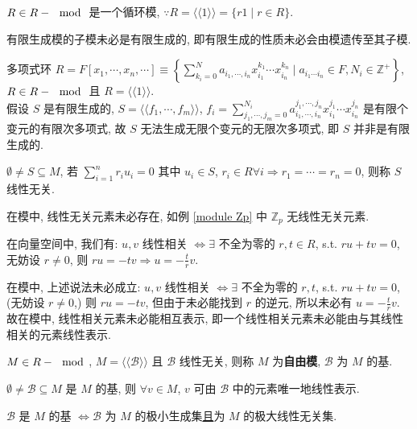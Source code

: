 \documentclass{note}
\begin{document}
\begin{eg}
    $R\in R-\mod$ 是一个循环模, $\because R=\langle\langle 1\rangle\rangle=\{r1\mid r\in R\}$.
\end{eg}

有限生成模的子模未必是有限生成的, 即有限生成的性质未必会由模遗传至其子模.
\begin{eg}
    多项式环 $R=F[x_1,\cdots,x_n,\cdots]\equiv\left\{\sum_{k_i=0}^Na_{i_1,\cdots,i_n}x_{i_1}^{k_1}\cdots x_{i_n}^{k_n}\mid a_{i_1\cdots i_n}\in F,N_i\in\mathbb{Z}^+\right\}$, $R\in R-\mod$ 且 $R=\langle\langle 1\rangle\rangle$.\\
    假设 $S$ 是有限生成的, $S=\langle\langle f_1,\cdots,f_m\rangle\rangle$, $f_i=\sum_{j_1,\cdots,j_m=0}^{N_i}a_{i_1,\cdots,i_n}^{j_1,\cdots,j_n}x_{i_1}^{j_1}\cdots x_{i_n}^{j_n}$ 是有限个变元的有限次多项式, 故 $S$ 无法生成无限个变元的无限次多项式, 即 $S$ 并非是有限生成的.
\end{eg}

\begin{df}[线性无关]
    $\emptyset\neq S\subseteq M$, 若 $\sum_{i=1}^nr_iu_i=0$ 其中 $u_i\in S$, $r_i\in R\forall i\Longrightarrow r_1=\cdots=r_n=0$, 则称 $S$ 线性无关.
\end{df}

在模中, 线性无关元素未必存在, 如例 \ref{module Zp} 中 $\mathbb{Z}_p$ 无线性无关元素.

在向量空间中, 我们有: $u,v$ 线性相关 $\Longleftrightarrow\exists$ 不全为零的 $r,t\in R$, s.t. $ru+tv=0$, 无妨设 $r\neq 0$, 则 $ru=-tv\Longrightarrow u=-\frac{t}{r}v$.

在模中, 上述说法未必成立: $u,v$ 线性相关 $\Longleftrightarrow\exists$ 不全为零的 $r,t$, s.t. $ru+tv=0$, (无妨设 $r\neq 0$,) 则 $ru=-tv$, 但由于未必能找到 $r$ 的逆元, 所以未必有 $u=-\frac{t}{r}v$. 故在模中, 线性相关元素未必能相互表示, 即一个线性相关元素未必能由与其线性相关的元素线性表示.

\begin{df}[自由模]
    $M\in R-\mod$, $M=\langle\langle\mathcal{B}\rangle\rangle$ 且 $\mathcal{B}$ 线性无关, 则称 $M$ 为\textbf{自由模}, $\mathcal{B}$ 为 $M$ 的基.
\end{df}

\begin{thm}[(课本定理 4.3)]
    $\emptyset\neq\mathcal{B}\subseteq M$ 是 $M$ 的基, 则 $\forall v\in M$, $v$ 可由 $\mathcal{B}$ 中的元素唯一地线性表示.
\end{thm}

\begin{thm}[(课本定理 4.4)]
     $\mathcal{B}$ 是 $M$ 的基 $\Longleftrightarrow\mathcal{B}$ 为 $M$ 的极小生成集\uline{且}为 $M$ 的极大线性无关集.
\end{thm}
\end{document}
